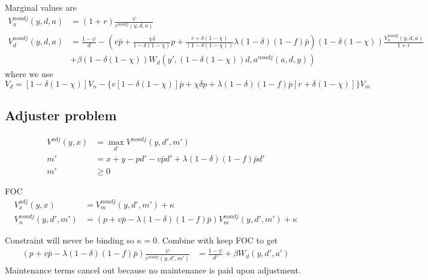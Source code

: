 \documentclass[11pt]{article}
\begin{document}
Marginal values are
\begin{align*}
    V_a^{noadj}(y,d,a)&=(1+r)\frac{\psi}{c^{noadj}(y,d,a)} \\
    V_d^{noadj}(y,d,a)&=\frac{1-\psi}{d} - \left(v\bar{p} + \frac{\chi \delta}{1-\delta(1-\chi)}p + \frac{ r+\delta(1-\chi) }{(1-\delta(1-\chi))}\lambda (1-\delta)(1-f) \bar{p} \right)(1-\delta(1-\chi))\frac{V_a^{noadj}(y,d,a)}{1+r} \\
    & + \beta (1-\delta(1-\chi)) W_d(y',(1-\delta(1-\chi))d,a^{noadj}(a,d,y))
\end{align*}
where we use $V_d = [1-\delta(1-\chi)]V_n - \{v [1-\delta(1-\chi)]\bar{p} + \chi \delta p +\lambda (1-\delta)(1-f) \bar{p} [r + \delta(1-\chi)]\} V_m $


\subsection{Adjuster problem}

\begin{align*}
    V^{adj}(y,x) &= \max_{d'} V^{noadj}(y,d',m') \\
    m' &= x+y-pd' - v\bar{p}d' + \lambda (1-\delta)(1-f) \bar{p}d'  \\
    m' &\ge 0
\end{align*}

FOC
\begin{align*}
    V_x^{adj}(y,x) &= V_m^{noadj}(y,d',m') + \kappa \\
    V_n^{noadj}(y,d',m') &= \left(p+ v\bar{p} - \lambda (1-\delta)(1-f)\bar{p} \right) V_m^{noadj}(y,d',m') + \kappa
\end{align*}

Constraint will never be binding so $\kappa=0$. 
Combine with keep FOC to get
\begin{align*}
    \left(p + v\bar{p}-  \lambda(1-\delta)(1-f)\bar{p}\right)\frac{\psi}{c^{noadj}(y,d',m')} &=   \frac{1-\psi}{d'}  + \beta W_d(y,d',a') 
\end{align*}
Maintenance terms cancel out because no maintenance is paid upon adjustment.
\end{document}
